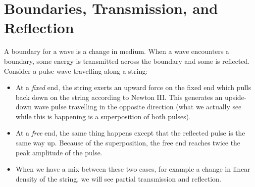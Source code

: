 \documentclass[../classical_mechanics.tex]{subfiles}
\begin{document}
    \section{Boundaries, Transmission, and Reflection}\label{sec:boundaries-transmision-and-reflection}
        A boundary for a wave is a change in medium.
        When a wave encounters a boundary, some energy is transmitted across the boundary and some is reflected.
        Consider a pulse wave travelling along a string:
        \begin{itemize}
            \item At a \textit{fixed} end, the string exerts an upward force on the fixed end which pulls back down on the string according to Newton III.
            This generates an upside-down wave pulse travelling in the opposite direction (what we actually see while this is happening is a superposition of both pulses).
            \item At a \textit{free} end, the same thing happens except that the reflected pulse is the same way up.
            Because of the superposition, the free end reaches twice the peak amplitude of the pulse.
            \item When we have a mix between these two cases, for example a change in linear density of the string, we will see partial transmission and reflection.
        \end{itemize}
\end{document}
